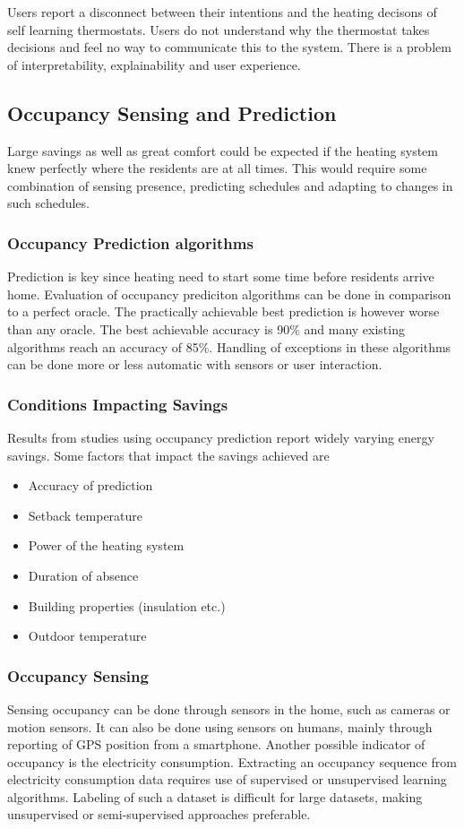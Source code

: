 Users report a disconnect between their intentions and the heating decisons of self learning thermostats.
Users do not understand why the thermostat takes decisions and feel no way to communicate this to the system.
There is a problem of interpretability, explainability and user experience.

\subsection{Occupancy Sensing and Prediction}
Large savings as well as great comfort could be expected if the heating system knew perfectly where the residents are at all times.
This would require some combination of sensing presence, predicting schedules and adapting to changes in such schedules.

\subsubsection{Occupancy Prediction algorithms}
Prediction is key since heating need to start some time before residents arrive home.
Evaluation of occupancy prediciton algorithms can be done in comparison to a perfect oracle.
The practically achievable best prediction is however worse than any oracle.
The best achievable accuracy is 90\% and many existing algorithms reach an accuracy of 85\%.
Handling of exceptions in these algorithms can be done more or less automatic with sensors or user interaction.

\subsubsection{Conditions Impacting Savings}
Results from studies using occupancy prediction report widely varying energy savings.
Some factors that impact the savings achieved are

\begin{itemize}
    \item Accuracy of prediction
    \item Setback temperature
    \item Power of the heating system
    \item Duration of absence
    \item Building properties (insulation etc.)
    \item Outdoor temperature
\end{itemize}

\subsubsection{Occupancy Sensing}
Sensing occupancy can be done through sensors in the home, such as cameras or motion sensors.
It can also be done using sensors on humans, mainly through reporting of GPS position from a smartphone.
Another possible indicator of occupancy is the electricity consumption.
Extracting an occupancy sequence from electricity consumption data requires use of supervised or unsupervised learning algorithms.
Labeling of such a dataset is difficult for large datasets, making unsupervised or semi-supervised approaches preferable.

